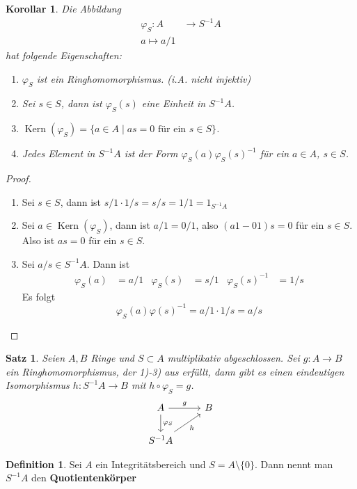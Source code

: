 \documentclass[10pt,a4paper]{article}
\newcommand{\Kern}{\operatorname{Kern}}
\theoremstyle{plain}
\newtheorem{kor}[theorem]{Korollar}
\newtheorem{satz}[theorem]{Satz}
\theoremstyle{definition}
\newtheorem{definition}[theorem]{Definition}
\theoremstyle{remark}
\begin{document}
	\begin{kor}
		Die Abbildung
		\begin{align*}
			\varphi_S:A&\to S^{-1}A\\
			a\mapsto a/1
		\end{align*}
		hat folgende Eigenschaften:
		\begin{enumerate}
			\item $\varphi_S$ ist ein Ringhomomorphismus. (i.A. nicht injektiv)
			\item Sei $s\in S$, dann ist $\varphi_S(s)$ eine Einheit in $S^{-1}A$.
			\item $\Kern(\varphi_S)=\{a\in A\mid\text{$as=0$ für ein $s\in S$}\}$.
			\item Jedes Element in $S^{-1}A$ ist der Form $\varphi_S(a)\varphi_S(s)^{-1}$ für ein $a\in A$, $s\in S$.
		\end{enumerate}
	\end{kor}
	\begin{proof}
		\begin{enumerate}
			\item Sei $s\in S$, dann ist $s/1\cdot 1/s=s/s=1/1=1_{S^{-1}A}$
			\item Sei $a\in\Kern(\varphi_S)$, dann ist $a/1=0/1$, also $(a1-01)s=0$ für ein $s\in S$. Also ist $as=0$ für ein $s\in S$.
			\item  Sei $a/s\in S^{-1}A$. Dann ist
			\begin{align*}
			\varphi_S(a)&=a/1& \varphi_S(s)&=s/1 &\varphi_S(s)^{-1}&=1/s
			\end{align*}
			Es folgt
			\[\varphi_S(a)\varphi(s)^{-1}=a/1\cdot 1/s=a/s\]
		\end{enumerate}
	\end{proof}

	\begin{satz}
		Seien $A,B$ Ringe und $S\subset A$ multiplikativ abgeschlossen. Sei $g:A\to B$ ein Ringhomomorphismus, der 1)-3) aus %
		erfüllt, dann gibt es einen eindeutigen Isomorphismus $h:S^{-1}A\to B$ mit $h\circ \varphi_S=g$.
			\[
			\begin{tikzcd}
				A \ar[r,"g"] \arrow[d,"\varphi_S"] & B\\
				S^{-1}A \arrow[ur,"h"']&
			\end{tikzcd}
			\]
	\end{satz}

	\begin{definition}
		Sei $A$ ein Integritätsbereich und $S=A\setminus \{0\}$. Dann nennt man $S^{-1}A$  den \textbf{Quotientenkörper}
	\end{definition}
\end{document}

